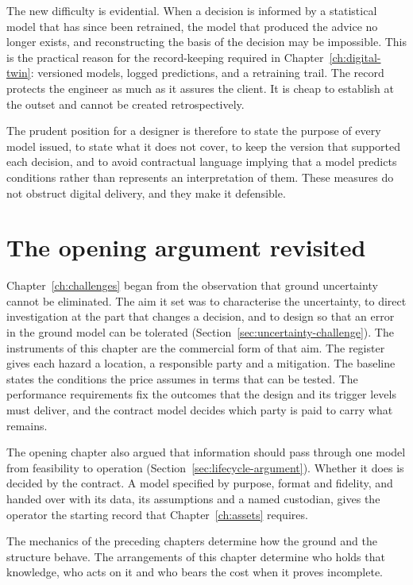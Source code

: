 The new difficulty is evidential. When a decision is informed by a
statistical model that has since been retrained, the model that produced the
advice no longer exists, and reconstructing the basis of the decision may be
impossible. This is the practical reason for the record-keeping required in
Chapter~\ref{ch:digital-twin}: versioned models, logged predictions, and a
retraining trail. The record protects the engineer as much as it assures
the client. It is cheap to establish at the outset and cannot be
created retrospectively.

The prudent position for a designer is therefore to state the purpose of
every model issued, to state what it does
not cover, to keep the version that supported each decision, and to avoid contractual
language implying that a model predicts conditions rather than represents an
interpretation of them. These measures do not obstruct digital delivery, and
they make it defensible.

\section{The opening argument revisited}
\label{sec:delivery-closing}

Chapter~\ref{ch:challenges} began from the observation that ground uncertainty
cannot be eliminated. The aim it set was to characterise the uncertainty, to
direct investigation at the part that changes a decision, and to design so
that an error in the ground model can be tolerated
(Section~\ref{sec:uncertainty-challenge}). The instruments of this chapter are
the commercial form of that aim. The register gives each hazard a location, a
responsible party and a mitigation. The baseline states the conditions the
price assumes in terms that can be tested. The performance requirements fix
the outcomes that the design and its trigger levels must deliver, and the
contract model decides which party is paid to carry what remains.

The opening chapter also argued that information should pass through one model
from feasibility to operation (Section~\ref{sec:lifecycle-argument}). Whether
it does is decided by the contract. A model specified by purpose, format and
fidelity, and handed over with its data, its assumptions and a named
custodian, gives the operator the starting record that
Chapter~\ref{ch:assets} requires.

The mechanics of the preceding chapters determine how the ground and the
structure behave. The arrangements of this chapter determine who holds that
knowledge, who acts on it and who bears the cost when it proves incomplete.

\chapterreferences
